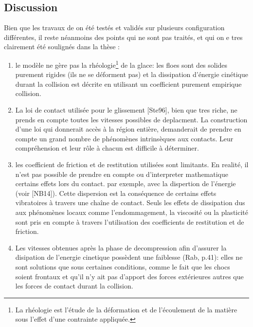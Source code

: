 \subsection{Discussion}
Bien que les travaux de \citeauthor{rabatel2015thesis} on été testés et validés sur plusieurs configuration différentes, il reste néanmoins des points qui ne sont pas traités, et qui on e tres clairement été soulignés dans la thèse \parencite{rabatel2015thesis} :
\begin{enumerate}
    \item le modèle ne gère pas la rhéologie\footnote{La rhéologie est l'étude de la déformation et de l'écoulement de la matière sous l'effet d'une contrainte appliquée.} de la glace: les floes sont des solides purement rigides (ils ne se déforment pas) et la dissipation d’énergie cinétique durant la collision est décrite en utilisant un coefficient purement empirique collision.  
    \item La loi de contact utilisée pour le glissement [Ste96], bien que tres riche, ne prends en compte toutes les vitesses possibles de deplacment. La construction d’une loi qui donnerait accès à la région entière, demanderait de prendre en compte un grand nombre de phénomènes intrinsèques aux contacts. Leur compréhension et leur rôle à chacun est difficile à déterminer. 
    \item les coefficient de friction et de restitution utilisées sont limitants. En realité, il n’est pas possible de prendre en compte ou d'interpreter mathematique certains effets lors du contact. par exemple, avec la dispertion de l'énergie (voir [NB14]). Cette dispersion est la conséquence de certains effets vibratoires à travers une chaîne de contact. Seuls les effets de dissipation dus aux phénomènes locaux comme l’endommagement, la viscosité ou la plasticité sont pris en compte à travers l’utilisation des coefficients de restitution et de friction.
    \item Les vitesses obtenues après la phase de decompression afin d'assurer la disipation de l'energie cinetique possèdent une faiblesse (Rab, p.41): elles ne sont solutions que sous certaines conditions, comme le fait que les chocs soient frontaux et qu’il n’y ait pas d’apport des forces extérieures autres que les forces de contact durant la collision.
\end{enumerate}

